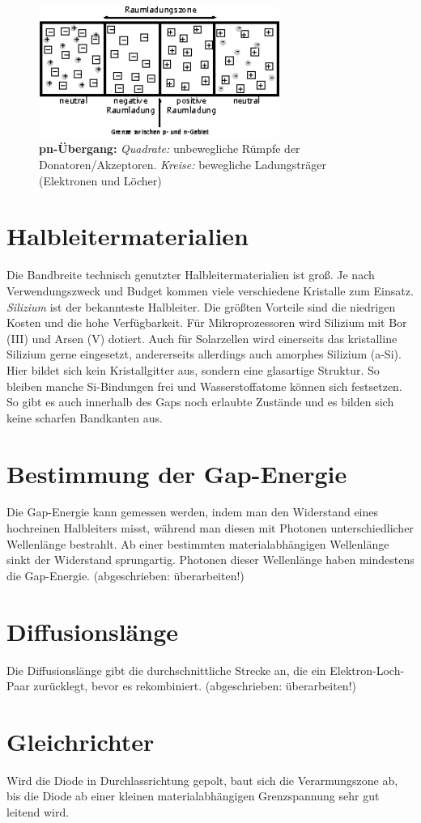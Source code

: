 \begin{figure}[htb]
	\centering
	\includegraphics[width=0.7\textwidth]{Abb/pn.eps}
	\caption{\textbf{pn-Übergang:} \emph{Quadrate:} unbewegliche Rümpfe der Donatoren/Akzeptoren. \emph{Kreise:} bewegliche Ladungsträger (Elektronen und Löcher)}
	\label{pn}
\end{figure}

\section*{Halbleitermaterialien}
Die Bandbreite technisch genutzter Halbleitermaterialien ist groß. Je nach Verwendungszweck und Budget kommen viele verschiedene Kristalle zum Einsatz.\\
\emph{Silizium} ist der bekannteste Halbleiter. Die größten Vorteile sind die niedrigen Kosten und die hohe Verfügbarkeit. Für Mikroprozessoren wird Silizium mit Bor (III) und Arsen (V) dotiert. Auch für Solarzellen wird einerseits das kristalline Silizium gerne eingesetzt, andererseits allerdings auch amorphes Silizium (a-Si). Hier bildet sich kein Kristallgitter aus, sondern eine glasartige Struktur. So bleiben manche Si-Bindungen frei und Wasserstoffatome können sich festsetzen. So gibt es auch innerhalb des Gaps noch erlaubte Zustände und es bilden sich keine scharfen Bandkanten aus. 


\section*{Bestimmung der Gap-Energie}
Die Gap-Energie kann gemessen werden, indem man den Widerstand eines hochreinen Halbleiters misst, während man diesen mit Photonen unterschiedlicher Wellenlänge bestrahlt. Ab einer bestimmten materialabhängigen Wellenlänge sinkt der Widerstand sprungartig. Photonen dieser Wellenlänge haben mindestens die Gap-Energie.
(abgeschrieben: überarbeiten!)

\section*{Diffusionslänge}
Die Diffusionslänge gibt die durchschnittliche Strecke an, die ein Elektron-Loch-Paar zurücklegt, bevor es rekombiniert. (abgeschrieben: überarbeiten!)

\section*{Gleichrichter}
Wird die Diode in Durchlassrichtung gepolt, baut sich die Verarmungszone ab, bis die Diode ab einer kleinen materialabhängigen Grenzspannung sehr gut leitend wird.

